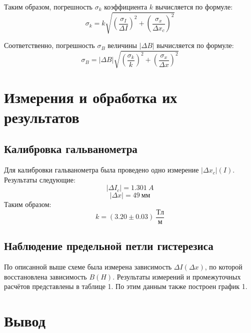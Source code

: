 \documentclass[14pt, a4paper,reqno]{article}
\begin{document}
    Таким образом, погрешность $\sigma_k$ коэффициента $k$ вычисляется по формуле:
    \begin{equation*}
        \sigma_k = k \sqrt{\left(\frac{\sigma_I}{\Delta I}\right)^2 + \left(\frac{\sigma_x}{\Delta x_c}\right)^2}
    \end{equation*}

    Соответственно, погрешность $\sigma_B$ величины $|\Delta B|$ вычисляется по формуле:
    \begin{equation*}
        \sigma_B = |\Delta B|\sqrt{\left(\frac{\sigma_k}{k}\right)^2 + \left(\frac{\sigma_x}{\Delta x}\right)^2}
    \end{equation*}

\section{Измерения и обработка их результатов}

    \subsection{Калибровка гальванометра}

        Для калибровки гальванометра была проведено одно измерение $|\Delta x_c|(I)$. Результаты следующие:
        \begin{equation*}
            |\Delta I_c| = 1.301\ A
        \end{equation*}
        \begin{equation*}
            |\Delta x| = 49\ мм
        \end{equation*}
        Таким образом:
        \begin{equation*}
            k = (3.20\pm 0.03)\ \frac{Тл}{м}
        \end{equation*}

    \subsection{Наблюдение предельной петли гистерезиса}

        По описанной выше схеме была измерена зависимость $\Delta I(\Delta x)$, по которой восстановлена зависимость
        $B(H)$. Результаты измерений и промежуточных расчётов представлены в таблице 1. По этим данным также построен
        график 1.

\section{Вывод}
\end{document}
